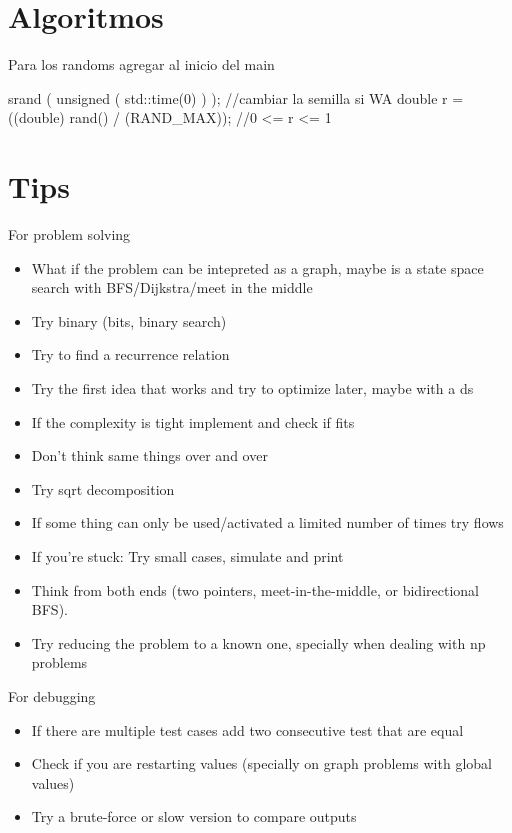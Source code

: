 \documentclass[10pt, landscape, twocolumn, a4paper, notitlepage]{article}
\begin{document}
\tableofcontents\newpage

\section{Algoritmos}
Para los randoms agregar al inicio del main
\begin{code}
srand ( unsigned ( std::time(0) ) ); //cambiar la semilla si WA
double r = ((double) rand() / (RAND_MAX)); //0 <= r <= 1 
\end{code}

\section{Tips}
For problem solving
\begin{itemize}
  \item What if the problem can be intepreted as a graph, maybe is a state space search with BFS/Dijkstra/meet in the middle
  \item Try binary (bits, binary search) 
  \item Try to find a recurrence relation
  \item Try the first idea that works and try to optimize later, maybe with a ds
  \item If the complexity is tight implement and check if fits
  \item Don't think same things over and over
  \item Try sqrt decomposition 
  \item If some thing can only be used/activated a limited number of times try flows
  \item If you’re stuck: Try small cases, simulate and print
  \item Think from both ends (two pointers, meet-in-the-middle, or bidirectional BFS).
  \item Try reducing the problem to a known one, specially when dealing with np problems
\end{itemize}

For debugging
\begin{itemize}
    \item If there are multiple test cases add two consecutive test that are equal
    \item Check if you are restarting values (specially on graph problems with global values)
    \item Try a brute-force or slow version to compare outputs 
\end{itemize}
\end{document}
